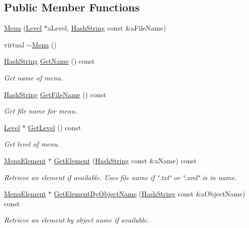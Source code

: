 \subsection*{Public Member Functions}
\begin{DoxyCompactItemize}
\item 
\hyperlink{classMenu_a0f665254cb96f98732580ab6ebbda900}{Menu} (\hyperlink{classLevel}{Level} $\ast$a\+Level, \hyperlink{classHashString}{Hash\+String} const \&a\+File\+Name)
\item 
virtual \hyperlink{classMenu_a831387f51358cfb88cd018e1777bc980}{$\sim$\+Menu} ()
\item 
\hyperlink{classHashString}{Hash\+String} \hyperlink{classMenu_a6cd6518c67b474e3cdee81b49e1c8780}{Get\+Name} () const 
\begin{DoxyCompactList}\small\item\em Get name of menu. \end{DoxyCompactList}\item 
\hyperlink{classHashString}{Hash\+String} \hyperlink{classMenu_a6774ae79d40b4eb11173ead85972ed41}{Get\+File\+Name} () const 
\begin{DoxyCompactList}\small\item\em Get file name for menu. \end{DoxyCompactList}\item 
\hyperlink{classLevel}{Level} $\ast$ \hyperlink{classMenu_a74e17d8865e1db6e8b357d7846c9b262}{Get\+Level} () const 
\begin{DoxyCompactList}\small\item\em Get level of menu. \end{DoxyCompactList}\item 
\hyperlink{classMenuElement}{Menu\+Element} $\ast$ \hyperlink{classMenu_a311fbd891529029744d8f5e3c2685f5f}{Get\+Element} (\hyperlink{classHashString}{Hash\+String} const \&a\+Name) const 
\begin{DoxyCompactList}\small\item\em Retrieve an element if available. Uses file name if \char`\"{}.\+txt\char`\"{} or \char`\"{}.\+xml\char`\"{} is in name. \end{DoxyCompactList}\item 
\hyperlink{classMenuElement}{Menu\+Element} $\ast$ \hyperlink{classMenu_acb708b02b682adef1a8ca6947097c7d7}{Get\+Element\+By\+Object\+Name} (\hyperlink{classHashString}{Hash\+String} const \&a\+Object\+Name) const 
\begin{DoxyCompactList}\small\item\em Retrieve an element by object name if available. \end{DoxyCompactList}\item 

\end{DoxyCompactItemize}
